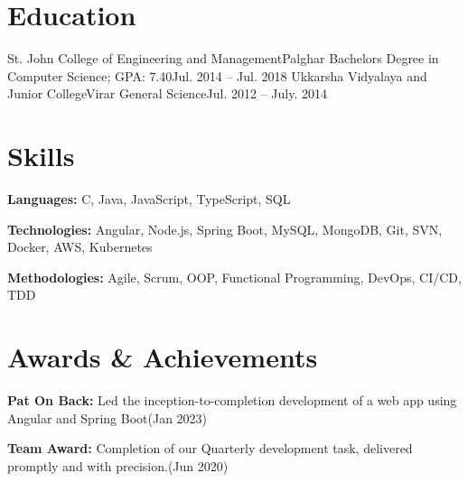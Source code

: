 \documentclass{resume}
\begin{document}

\resumeItemListEnd

\resumeSubHeadingListEnd

\section{Education}
  \resumeSubHeadingListStart
    \resumeSubheading
      {St. John College of Engineering and Management}{Palghar}
      {Bachelors Degree in Computer Science;  GPA: 7.40}{Jul. 2014 -- Jul. 2018}
    \resumeSubheading
      {Ukkarsha Vidyalaya and Junior College}{Virar}
      {General Science}{Jul. 2012 -- July. 2014}
  \resumeSubHeadingListEnd




\section{Skills}
  \vspace{2pt}
  \resumeSubHeadingListStart
    \small{\item{
        
        \textbf{Languages:}{ C, Java, JavaScript, TypeScript, SQL} \\ \vspace{3pt}
        
        \textbf{Technologies:}{ Angular, Node.js, Spring Boot, MySQL, MongoDB, Git, SVN, Docker, AWS, Kubernetes} \\ \vspace{3pt}
        
        \textbf{Methodologies:}{ Agile, Scrum, OOP, Functional Programming, DevOps, CI/CD, TDD} \\ \vspace{3pt}
        
    }}
  \resumeSubHeadingListEnd


\section{Awards \& Achievements}
  \vspace{2pt}
  \resumeSubHeadingListStart
    \small{\item{
        \textbf{Pat On Back:}{ Led the inception-to-completion development of a web app using Angular and Spring Boot(Jan 2023)} \\ \vspace{3pt}

        \textbf{Team Award:}{ Completion of our Quarterly development task, delivered promptly and with precision.(Jun 2020)} \\ \vspace{3pt}
        
    }}
  \resumeSubHeadingListEnd
\end{document}
